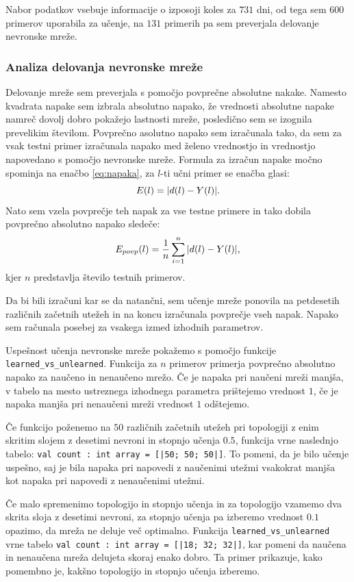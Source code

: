 \documentclass[mat1]{fmfdelo}
\begin{document}
Nabor podatkov vsebuje informacije o izposoji koles za $731$ dni, od tega sem $600$ primerov uporabila za učenje, na $131$ primerih pa sem preverjala delovanje nevronske mreže.
%
\subsubsection{Analiza delovanja nevronske mreže}
Delovanje mreže sem preverjala s pomočjo povprečne absolutne nakake. Namesto kvadrata napake sem izbrala absolutno napako, že vrednosti absolutne napake namreč dovolj dobro pokažejo lastnosti mreže, posledično sem se izognila prevelikim številom. Povprečno asolutno napako sem izračunala tako, da sem za vsak testni primer izračunala napako med želeno vrednostjo in vrednostjo napovedano s pomočjo nevronske mreže. Formula za izračun napake močno spominja na enačbo \eqref{eq:napaka}, za $l$-ti učni primer se enačba glasi:
%
\begin{equation*}
E(l) = |d(l)-Y(l)|\text.
\end{equation*}
%
 Nato sem vzela povprečje teh napak za vse testne primere in tako dobila povprečno absolutno napako sledeče:
 \begin{equation}
 E_{povp}(l) = \frac{1}{n}\sum_{i=1}^{n}|d(l)-Y(l)|\text,
 \end{equation}
 kjer $n$ predstavlja število testnih primerov.
 
  Da bi bili izračuni kar se da natančni, sem učenje mreže ponovila na petdesetih različnih začetnih utežeh in na koncu izračunala povprečje vseh napak. Napako sem računala posebej za vsakega izmed izhodnih parametrov.

Uspešnost učenja nevronske mreže pokažemo s pomočjo funkcije
 \texttt{learned\-\_vs\-\_unlearned}. Funkcija za $n$ primerov primerja povprečno absolutno napako za naučeno in nenaučeno mrežo. Če je napaka pri naučeni mreži manjša, v tabelo na mesto ustreznega izhodnega parametra prištejemo vrednost $1$, če je napaka manjša pri nenaučeni mreži vrednost $1$ odštejemo.

Če funkcijo poženemo na $50$ različnih začetnih utežeh pri topologiji z enim skritim slojem z desetimi nevroni in stopnjo učenja $0.5$, funkcija vrne naslednjo tabelo:
\texttt{val count : int array = [|50; 50; 50|]}. To pomeni, da je bilo učenje uspešno, saj je bila napaka pri napovedi z naučenimi utežmi vsakokrat manjša kot napaka pri napovedi z nenaučenimi utežmi.

Če malo spremenimo topologijo in stopnjo učenja in za topologijo vzamemo dva skrita sloja z desetimi nevroni, za stopnjo učenja pa izberemo vrednost $0.1$ opazimo, da mreža ne deluje več optimalno. Funkcija \-  \texttt{learned\-\_vs\-\_unlearned} vrne tabelo \texttt{val count : int array = [|18; 32; 32|]}, kar pomeni da naučena in nenaučena mreža delujeta skoraj enako dobro. Ta primer prikazuje, kako pomembno je, kakšno topologijo in stopnjo učenja izberemo. 
\end{document}
